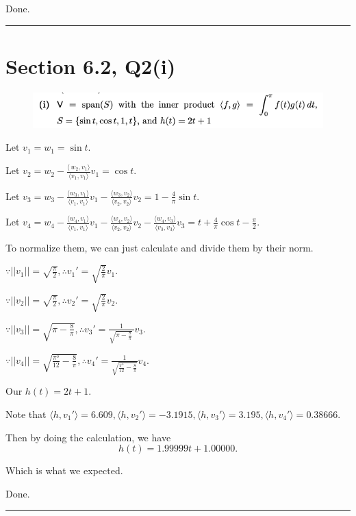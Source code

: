 \documentclass[12pt]{article}%
\begin{document}
Done.

\noindent\rule[0.1ex]{\linewidth}{1pt}

\section{Section 6.2, Q2(i)}
\begin{figure}[htp]
    \centering %
    \includegraphics[width = 15cm]{img/Q7.png}
\end{figure}

Let $v_1=w_1=\sin{t}$.

Let $v_2=w_2-\frac{\langle\, w_2,v_1 \rangle}{\langle v_1,v_1\rangle}v_1=\cos{t}.$

Let $v_3=w_3-\frac{\langle w_3,v_1 \rangle}{\langle v_1,v_1 \rangle}v_1-\frac{\langle w_3,v_2 \rangle}{\langle v_2,v_2 \rangle}v_2=1-\frac{4}{\pi}\sin{t}.$

Let $v_4=w_4-\frac{\langle w_4,v_1 \rangle}{\langle v_1,v_1 \rangle}v_1-\frac{\langle w_4,v_2 \rangle}{\langle v_2,v_2 \rangle}v_2-\frac{\langle w_4,v_3 \rangle}{\langle v_3,v_3\rangle}v_3=t+\frac{4}{\pi}\cos{t}-\frac{\pi}{2}.$

To normalize them, we can just calculate and divide them by their norm.

$\because ||v_1||=\sqrt{\frac{\pi}{2}}, \therefore v_1'=\sqrt{\frac{2}{\pi}}v_1.$

$\because ||v_2||=\sqrt{\frac{\pi}{2}}, \therefore v_2'=\sqrt{\frac{2}{\pi}}v_2.$

$\because ||v_3||=\sqrt{\pi-\frac{8}{\pi}}, \therefore v_3'=\frac{1}{\sqrt{\pi-\frac{8}{\pi}}~}v_3.$

$\because ||v_4||=\sqrt{\frac{\pi^3}{12}-\frac{8}{\pi}}, \therefore v_4'=\frac{1}{\sqrt{ \frac{\pi^3}{12}-\frac{8}{\pi}} }v_4.$

Our $h(t)=2t+1.$

Note that $\langle h, v_1'\rangle =6.609, \langle h, v_2'\rangle =-3.1915, \langle h, v_3'\rangle =3.195, \langle h, v_4'\rangle =0.38666.$

Then by doing the calculation, we have $$h(t)=1.99999t+1.00000.$$

Which is what we expected.

Done.

\noindent\rule[0.1ex]{\linewidth}{1pt}
\end{document}
